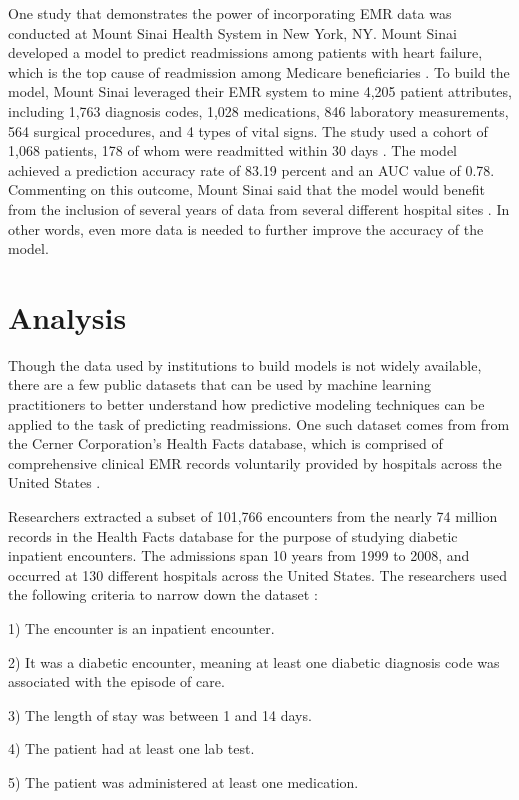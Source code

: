 \documentclass[sigconf]{acmart}
\begin{document}
One study that demonstrates the power of incorporating EMR data was conducted at Mount Sinai Health System in New York, NY. Mount Sinai developed a model to predict readmissions among patients with heart failure, which is the top cause of readmission among Medicare beneficiaries \cite{cite01}. To build the model, Mount Sinai leveraged their EMR system to mine 4,205 patient attributes, including 1,763 diagnosis codes, 1,028 medications, 846 laboratory measurements, 564 surgical procedures, and 4 types of vital signs. The study used a cohort of 1,068 patients, 178 of whom were readmitted within 30 days \cite{cite01}. The model achieved a prediction accuracy rate of 83.19 percent and an AUC value of 0.78. Commenting on this outcome, Mount Sinai said that the model would benefit from the inclusion of several years of data from several different hospital sites \cite{cite01}. In other words, even more data is needed to further improve the accuracy of the model.

\section{Analysis}

Though the data used by institutions to build models is not widely available, there are a few public datasets that can be used by machine learning practitioners to better understand how predictive modeling techniques can be applied to the task of predicting readmissions. One such dataset comes from from the Cerner Corporation's Health Facts database, which is comprised of comprehensive clinical EMR records voluntarily provided by hospitals across the United States \cite{cite11}.

Researchers extracted a subset of 101,766 encounters from the nearly 74 million records in the Health Facts database for the purpose of studying diabetic inpatient encounters. The admissions span 10 years from 1999 to 2008, and occurred at 130 different hospitals across the United States. The researchers used the following criteria to narrow down the dataset \cite{cite11}:

1) The encounter is an inpatient encounter.

2) It was a diabetic encounter, meaning at least one diabetic diagnosis code was associated with the episode of care.

3) The length of stay was between 1 and 14 days.

4) The patient had at least one lab test.

5) The patient was administered at least one medication.
\end{document}
